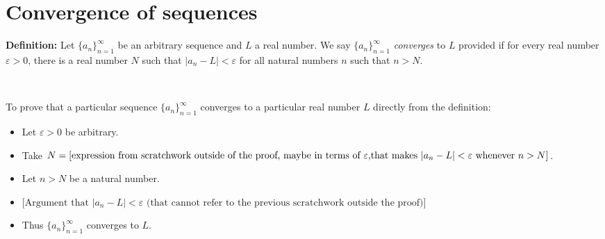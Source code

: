 \documentclass[12pt]{amsart}
\newcommand{\e}{\varepsilon}
\begin{document}
	
	\thispagestyle{empty}
	
	\section*{Convergence of sequences}
	
	

\begin{framed}
\noindent \textbf{Definition:} Let $\{a_n\}_{n=1}^\infty$ be an arbitrary sequence and $L$ a real number. We say $\{a_n\}_{n=1}^\infty$ {\em converges} to $L$ provided if for every real number $\e > 0$, there is a real number $N$ such that $|a_n - L| < \e$ for all natural numbers $n$ such that $n > N$.

\

\noindent To prove that a particular sequence $\{a_n\}_{n=1}^\infty$ converges to a particular real number $L$ directly from the definition:
\begin{itemize}
\item Let $\e>0$ be arbitrary.
\item Take $N=[\text{expression from scratchwork outside of the proof, maybe in terms of $\e$,} \\ \text{that makes } {|a_n-L|<\e} \text{ whenever } n>N]$.
\item Let $n>N$ be a natural number.
\item $\text{[Argument that } |a_n-L|<\e \text{ (that cannot refer to the previous scratchwork outside the proof)}]$
\item Thus $\{a_n\}_{n=1}^\infty$ converges to $L$.
\end{itemize}
\end{framed}

\
\end{document}
